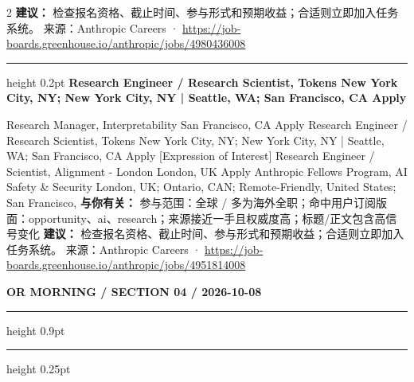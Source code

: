 \documentclass[10.5pt]{ctexart}
\begin{document}
\begin{multicols}{2}
\textbf{建议：} 检查报名资格、截止时间、参与形式和预期收益；合适则立即加入任务系统。
{\footnotesize\color{ormuted} 来源：Anthropic Careers · \url{https://job-boards.greenhouse.io/anthropic/jobs/4980436008}}
\vspace{2mm}
\hrule height 0.2pt
\vspace{2mm}
{\large\bfseries Research Engineer / Research Scientist, Tokens New York City, NY; New York City, NY | Seattle, WA; San Francisco, CA Apply}\par
[Expression of Interest] Research Manager, Interpretability San Francisco, CA Apply Research Engineer / Research Scientist, Tokens New York City, NY; New York City, NY | Seattle, WA; San Francisco, CA Apply [Expression of Interest] Research Engineer / Scientist, Alignment - London London, UK Apply Anthropic Fellows Program, AI Safety \& Security London, UK; Ontario, CAN; Remote-Friendly, United States; San Francisco, 
\textbf{与你有关：} 参与范围：全球 / 多为海外全职；命中用户订阅版面：opportunity、ai、research；来源接近一手且权威度高；标题/正文包含高信号变化
\textbf{建议：} 检查报名资格、截止时间、参与形式和预期收益；合适则立即加入任务系统。
{\footnotesize\color{ormuted} 来源：Anthropic Careers · \url{https://job-boards.greenhouse.io/anthropic/jobs/4951814008}}
\end{multicols}
\newpage
{\small\bfseries OR MORNING / SECTION 04 / 2026-10-08}
\vspace{2mm}
\hrule height 0.9pt
\vspace{1.5mm}
\hrule height 0.25pt
\vspace{4mm}
\end{document}
